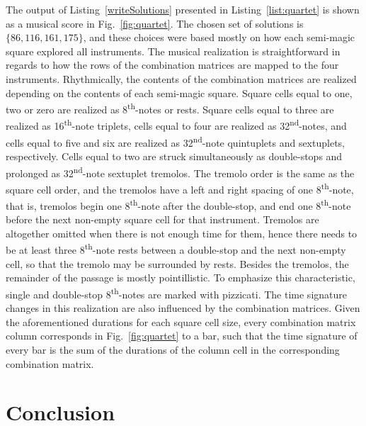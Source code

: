 The output of Listing~\ref{writeSolutions} presented in Listing~\ref{list:quartet} is shown as a musical score in Fig.~\ref{fig:quartet}. The chosen set of solutions is $\{86, 116, 161, 175\}$, and these choices were based mostly on how each semi-magic square explored all instruments. The musical realization is straightforward in regards to how the rows of the combination matrices are mapped to the four instruments. Rhythmically, the contents of the combination matrices are realized depending on the contents of each semi-magic square. Square cells equal to one, two or zero are realized as 8\textsuperscript{th}-notes or rests. Square cells equal to three are realized as 16\textsuperscript{th}-note triplets, cells equal to four are realized as 32\textsuperscript{nd}-notes, and cells equal to five and six are realized as 32\textsuperscript{nd}-note quintuplets and sextuplets, respectively. Cells equal to two are struck simultaneously as double-stops and prolonged as 32\textsuperscript{nd}-note sextuplet tremolos. The tremolo order is the same as the square cell order, and the tremolos have a left and right spacing of one 8\textsuperscript{th}-note, that is, tremolos begin one 8\textsuperscript{th}-note after the double-stop, and end one 8\textsuperscript{th}-note before the next non-empty square cell for that instrument. Tremolos are altogether omitted when there is not enough time for them, hence there needs to be at least three 8\textsuperscript{th}-note rests between a double-stop and the next non-empty cell, so that the tremolo may be surrounded by rests. Besides the tremolos, the remainder of the passage is mostly pointillistic. To emphasize this characteristic, single and double-stop 8\textsuperscript{th}-notes are marked with pizzicati. The time signature changes in this realization are also influenced by the combination matrices. Given the aforementioned durations for each square cell size, every combination matrix column corresponds in Fig.~\ref{fig:quartet} to a bar, such that the time signature of every bar is the sum of the durations of the column cell in the corresponding combination matrix.

\section{Conclusion}

